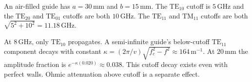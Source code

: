 \documentclass[12pt,a4paper]{article}
\begin{document}
\begin{tcolorbox}[examplebox,title={Cutoff ordering and below-cutoff decay}]
An air-filled guide has $a=30\,\mathrm{mm}$ and $b=15\,\mathrm{mm}$. The $\mathrm{TE}_{10}$ cutoff is $5\,\mathrm{GHz}$ and the $\mathrm{TE}_{20}$ and $\mathrm{TE}_{01}$ cutoffs are both $10\,\mathrm{GHz}$. The $\mathrm{TE}_{11}$ and $\mathrm{TM}_{11}$ cutoffs are both $\sqrt{5^2+10^2}=11.18\,\mathrm{GHz}$.

At $8\,\mathrm{GHz}$, only $\mathrm{TE}_{10}$ propagates. A semi-infinite guide's below-cutoff $\mathrm{TE}_{11}$ component decays with constant $\kappa=(2\pi/v)\sqrt{f_c^2-f^2}\approx164\,\mathrm{m^{-1}}$. At $20\,\mathrm{mm}$ the amplitude fraction is $e^{-\kappa(0.020)}\approx0.038$. This cutoff decay exists even with perfect walls. Ohmic attenuation above cutoff is a separate effect.
\end{tcolorbox}
\end{document}
